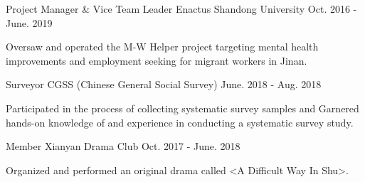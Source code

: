 

\begin{cventries}

  \cventry
    {Project Manager \& Vice Team Leader} %
    {Enactus Shandong University} %
    {} %
    {Oct. 2016 - June. 2019} %
    {
      \begin{cvitems} %
        \item {Oversaw and operated the M-W Helper project targeting mental health improvements and employment seeking for migrant workers in Jinan.}
      \end{cvitems}
    }



  \cventry
    {Surveyor} %
    {CGSS (Chinese General Social Survey)} %
    {} %
    {June. 2018 - Aug. 2018} %
    {
      \begin{cvitems} %
        \item {Participated in the process of collecting systematic survey samples and Garnered hands-on knowledge of and experience in conducting a systematic survey study.}
      \end{cvitems}
    }

  \cventry
    {Member} %
    {Xianyan Drama Club} %
    {} %
    {Oct. 2017 - June. 2018} %
    {
      \begin{cvitems} %
        \item {Organized and performed an original drama called <A Difficult Way In Shu>.}
      \end{cvitems}
    }
\end{cventries}
